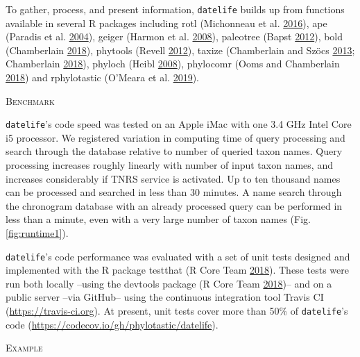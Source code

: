 \documentclass[]{article}
\begin{document}
To gather, process, and present information, \texttt{datelife} builds up from functions
available in several R packages including rotl (Michonneau et al. \protect\hyperlink{ref-Michonneau2016}{2016}), ape (Paradis et al. \protect\hyperlink{ref-Paradis2004}{2004}),
geiger (Harmon et al. \protect\hyperlink{ref-Harmon2008}{2008}), paleotree (Bapst \protect\hyperlink{ref-Bapst2012a}{2012}), bold (Chamberlain \protect\hyperlink{ref-Chamberlain2018}{2018}), phytools (Revell \protect\hyperlink{ref-Revell2012}{2012}),
taxize (Chamberlain and Szöcs \protect\hyperlink{ref-Chamberlain2013}{2013}; Chamberlain \protect\hyperlink{ref-Chamberlain2018}{2018}), phyloch (Heibl \protect\hyperlink{ref-Heibl2008}{2008}), phylocomr (Ooms and Chamberlain \protect\hyperlink{ref-Ooms2018}{2018})
and rphylotastic (O'Meara et al. \protect\hyperlink{ref-Omeara2019}{2019}).

\begin{center}
\textsc{Benchmark}
\end{center}

\texttt{datelife}'s code speed was tested on an Apple iMac
with one 3.4 GHz Intel Core i5 processor.
We registered variation in computing time of query processing and search through the database relative to number of queried taxon names.
Query processing increases roughly linearly with number of input taxon names, and
increases considerably if TNRS service is activated. Up to ten thousand names can be processed and searched in less than 30 minutes. A name search through the chronogram database with an already processed query can be performed in less than a minute, even with a very large number of taxon names (Fig. \ref{fig:runtime1}).

\texttt{datelife}'s code performance was evaluated with a set of unit tests designed and
implemented with the R package testthat (R Core Team \protect\hyperlink{ref-RCoreTeam2018}{2018}). These tests were run both
locally --using the devtools package (R Core Team \protect\hyperlink{ref-RCoreTeam2018}{2018})-- and on a public server --via
GitHub-- using the continuous integration tool Travis CI (\url{https://travis-ci.org}). At
present, unit tests cover more than 50\% of \texttt{datelife}'s code (\url{https://codecov.io/gh/phylotastic/datelife}).

\begin{center}
\textsc{Example}
\end{center}
\end{document}

